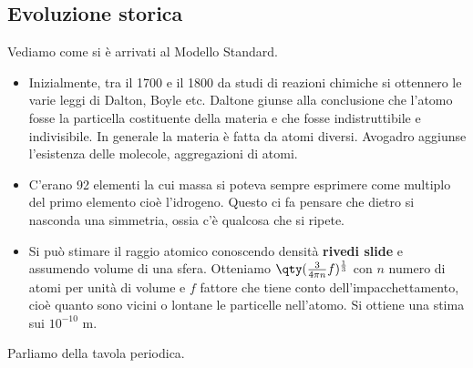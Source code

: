 \subsection{Evoluzione storica}
Vediamo come si è arrivati al Modello Standard.
\begin{itemize}
    \item Inizialmente, tra il 1700 e il 1800 da studi di reazioni chimiche si ottennero le varie leggi di Dalton, Boyle etc. Daltone giunse alla conclusione che l'atomo fosse la particella costituente della materia e che fosse indistruttibile e indivisibile. In generale la materia è fatta da atomi diversi. Avogadro aggiunse l'esistenza delle molecole, aggregazioni di atomi. 
    \item C'erano 92 elementi la cui massa si poteva sempre esprimere come multiplo del primo elemento cioè l'idrogeno. Questo ci fa pensare che dietro si nasconda una simmetria, ossia c'è qualcosa che si ripete.
    \item Si può stimare il raggio atomico conoscendo densità \textbf{rivedi slide} e assumendo volume di una sfera. Otteniamo $\qty(\frac{3}{4\pi n}f)^\frac13$ con $n$ numero di atomi per unità di volume e $f$ fattore che tiene conto dell'impacchettamento, cioè quanto sono vicini o lontane le particelle nell'atomo. Si ottiene una stima sui $10^{-10}$ m.
\end{itemize}
Parliamo della tavola periodica.

